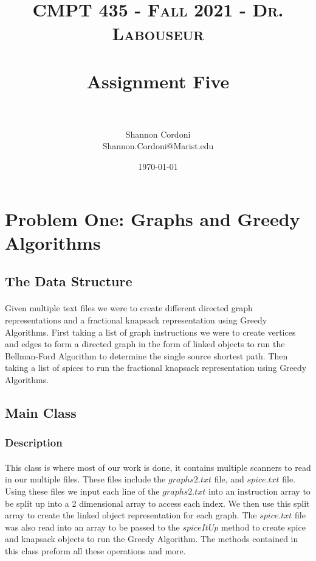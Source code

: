 \documentclass[letterpaper, 10pt,DIV=13]{scrartcl}
\title{	
   \normalfont \normalsize 
   \textsc{CMPT 435 - Fall 2021 - Dr. Labouseur} \\[10pt] %
   \horrule{0.5pt} \\[0.25cm] 	%
   \huge Assignment Five  \\     	    %
   \horrule{0.5pt} \\[0.25cm] 	%
}
\author{Shannon Cordoni \\ \normalsize Shannon.Cordoni@Marist.edu}
\date{\normalsize\today} 	%
\numberwithin{equation}{section} %
\numberwithin{figure}{section} %
\numberwithin{table}{section} %
\begin{document}
\maketitle %

\section{Problem One: Graphs and Greedy Algorithms}

\subsection{The Data Structure}
\paragraph{} Given multiple text files we were to create different directed graph representations and a fractional knapsack representation using Greedy Algorithms. First taking a list of graph instructions we were to create vertices and edges to form a directed graph in the form of linked objects to run the Bellman-Ford Algorithm to determine the single source shortest path. Then taking a list of spices to run the fractional knapsack representation using Greedy Algorithms.\\


\subsection{Main Class}

\subsubsection{Description}
\paragraph{}This class is where most of our work is done, it contains multiple scanners to read in our multiple files. These files include the $graphs2.txt$ file, and $spice.txt$ file. Using these files we input each line of the $graphs2.txt$ into an instruction array to be split up into a 2 dimensional array to access each index. We then use this split array to create the linked object representation for each graph. The $spice.txt$ file was also read into an array to be passed to the $spiceItUp$ method to create spice and knapsack objects to run the Greedy Algorithm. The methods contained in this class preform all these operations and more. 
\end{document}
